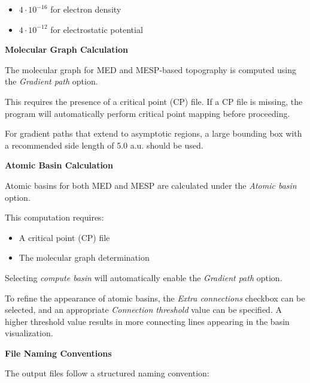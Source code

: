 \documentclass[10pt]{article}
\begin{document}
\begin{itemize}
\item $4 \cdot 10^{-16}$ for electron density
\item $4 \cdot 10^{-12}$ for electrostatic potential
\end{itemize}

\vspace*{3mm}
{\bf Molecular Graph Calculation}
\vspace*{3mm}

The molecular graph for MED and MESP-based topography
is computed using the {\it Gradient path} option.

This requires the presence of a critical point (CP) file.
If a CP file is missing, the program will automatically
perform critical point mapping before proceeding.

For gradient paths that extend to asymptotic regions,
a large bounding box with a recommended side length of 5.0 a.u. should be used.

\vspace*{3mm}
{\bf Atomic Basin Calculation}
\vspace*{3mm}

Atomic basins
for both MED and MESP are calculated under the {\it Atomic basin} option.

This computation requires:

\begin{itemize}
\item A critical point (CP) file
\item The molecular graph determination
\end{itemize}

Selecting {\it compute basin} will automatically enable the {\it Gradient path} option.

To refine the appearance of atomic basins,
the {\it Extra connections} checkbox can be selected,
and an appropriate {\it Connection threshold} value can be specified.
A higher threshold value results in more connecting lines appearing in the basin visualization.

\vspace*{3mm}
{\bf File Naming Conventions}
\vspace*{3mm}

The output files follow a structured naming convention:
\end{document}
